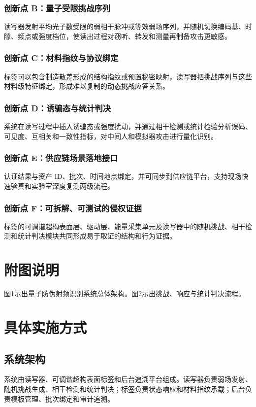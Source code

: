 ﻿\documentclass[12pt,a4paper]{article}
\begin{document}
\subsubsection{创新点 B：量子受限挑战序列}
读写器发射平均光子数受限的弱相干脉冲或等效弱场序列，并随机切换编码基、时隙、频点或强度档位，使读出过程对窃听、转发和测量再制备攻击更敏感。

\subsubsection{创新点 C：材料指纹与协议绑定}
标签可以包含制造散差形成的结构指纹或预置秘密映射，读写器把挑战序列与这些材料级特征绑定，形成难以复制的动态挑战应答关系。

\subsubsection{创新点 D：诱骗态与统计判决}
系统在读写过程中插入诱骗态或强度扰动，并通过相干检测或统计检验分析误码、可见度、互相关和一致性指标，对中间人和模拟器攻击进行量化识别。

\subsubsection{创新点 E：供应链场景落地接口}
认证结果与资产 ID、批次、时间地点绑定，并可同步到供应链平台，支持现场快速验真和实验室深度复测两级流程。

\subsubsection{创新点 F：可拆解、可测试的侵权证据}
标签的可调谐超构表面层、驱动层、能量采集单元及读写器中的随机挑战、相干检测和统计判决模块共同形成易于取证的结构和行为证据。

\section{附图说明}
图1示出量子防伪射频识别系统总体架构。图2示出挑战、响应与统计判决流程。

\section{具体实施方式}
\subsection{系统架构}
系统由读写器、可调谐超构表面标签和后台追溯平台组成。读写器负责弱场发射、随机挑战生成、相干检测和统计判决；标签负责状态响应和材料指纹承载；后台负责模板管理、批次绑定和审计追溯。
\end{document}
